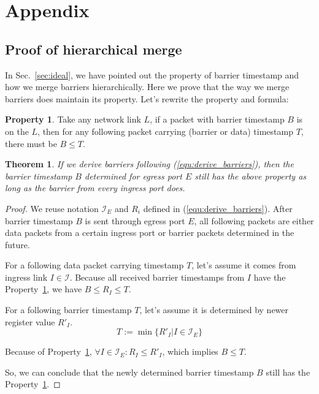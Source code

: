 \section{Appendix}
\newtheorem{theorem}{Theorem}[subsection]
\theoremstyle{definition}
\newtheorem{definition}{Definition}[subsection]
\newtheorem{property}{Property}[subsection]
\newtheorem*{assump}{Assumption}
\newtheorem*{notation}{Notation}
\newtheorem{lemma}[theorem]{Lemma}
\theoremstyle{remark}
\newtheorem*{rem}{Remark}
\newtheorem*{conclusion}{Conclusion}
\newtheorem*{note}{Note}
\subsection{Proof of hierarchical merge}
\label{appx:hierarchical_merge}
In Sec.~\ref{sec:ideal}, we have pointed out the property of barrier timestamp and how we merge barriers hierarchically. Here we prove that the way we merge barriers does maintain its property.
Let's rewrite the property and formula:
\begin{property}\label{prop:barrier}
	Take any network link $L$, if a packet with barrier timestamp $B$ is on the $L$, then for any following packet carrying (barrier or data) timestamp $T$, there must be $B \le T$.
\end{property}
\begin{theorem}
	If we derive barriers following (\ref{equ:derive_barriers}), then the barrier timestamp $B$ determined for egress port $E$ still has the above property as long as the barrier from every ingress port does.
\end{theorem}
\begin{proof}
	We reuse notation $\mathcal{I}_E$ and $R_i$ defined in (\ref{equ:derive_barriers}).
	After barrier timestamp $B$ is sent through egress port $E$, all following packets are either data packets from a certain ingress port or barrier packets determined in the future.

	For a following data packet carrying timestamp $T$, let's assume it comes from ingress link $I \in \mathcal{I}$. Because all received barrier timestamps from $I$ have the Property~\ref{prop:barrier}, we have $B \le R_I \le T$.

	For a following barrier timestamp $T$, let's assume it is determined by newer register value $R'_I$.
	$$T:=\min\{R'_I|I \in \mathcal{I}_E\}$$
	
	Because of Property~\ref{prop:barrier}, $\forall I \in \mathcal{I}_E:R_I \le R'_I$, which implies $B \le T$.

	So, we can conclude that the newly determined barrier timestamp $B$ still has the Property~\ref{prop:barrier}.
\end{proof}

